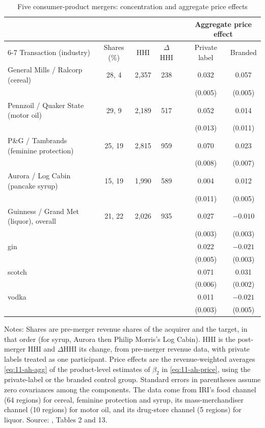 \begin{table}[htbp]
\centering
\caption{Five consumer-product mergers: concentration and aggregate price effects}
\label{tab:11-ah}
\footnotesize
\begin{tabular}{@{}lcccccc@{}}
\toprule
& & & & & \multicolumn{2}{c}{Aggregate price effect} \\
\cmidrule(l){6-7}
Transaction (industry) & Shares (\%) & HHI & $\Delta$HHI & & Private label & Branded \\
\midrule
General Mills / Ralcorp (cereal) & 28, 4 & 2,357 & 238 & & 0.032 & 0.057 \\
 & & & & & (0.005) & (0.005) \\
Pennzoil / Quaker State (motor oil) & 29, 9 & 2,189 & 517 & & 0.052 & 0.014 \\
 & & & & & (0.013) & (0.011) \\
P\&G / Tambrands (feminine protection) & 25, 19 & 2,815 & 959 & & 0.070 & 0.023 \\
 & & & & & (0.008) & (0.007) \\
Aurora / Log Cabin (pancake syrup) & 15, 19 & 1,990 & 589 & & 0.004 & 0.012 \\
 & & & & & (0.011) & (0.005) \\
Guinness / Grand Met (liquor), overall & 21, 22 & 2,026 & 935 & & 0.027 & $-0.010$ \\
 & & & & & (0.003) & (0.003) \\
\quad gin & & & & & 0.022 & $-0.021$ \\
 & & & & & (0.005) & (0.003) \\
\quad scotch & & & & & 0.071 & 0.031 \\
 & & & & & (0.006) & (0.002) \\
\quad vodka & & & & & 0.011 & $-0.021$ \\
 & & & & & (0.003) & (0.005) \\
\bottomrule
\end{tabular}

\smallskip
\begin{minipage}{0.97\linewidth}
\footnotesize Notes: Shares are pre-merger revenue shares of the acquirer and the target, in that order (for syrup,
Aurora then Philip Morris's Log Cabin). HHI is the post-merger HHI and $\Delta$HHI its change, from pre-merger
revenue data, with private labels treated as one participant. Price effects are the revenue-weighted averages
\eqref{eq:11-ah-agg} of the product-level estimates of $\beta_2$ in \eqref{eq:11-ah-price}, using the private-label
or the branded control group. Standard errors in parentheses assume zero covariances among the components. The data come from IRI's food channel (64 regions) for
cereal, feminine protection and syrup, its mass-merchandiser channel (10 regions) for motor oil, and its drug-store
channel (5 regions) for liquor. Source: \citet{AshenfelterHosken2008}, Tables 2 and 13.
\end{minipage}
\end{table}


